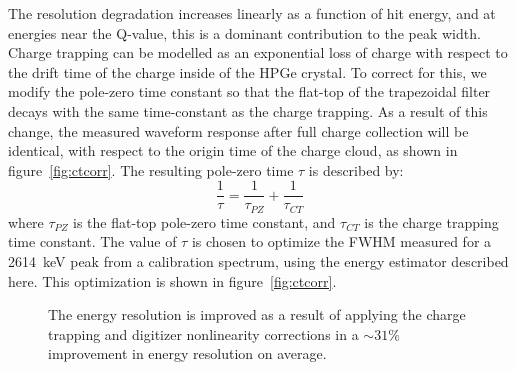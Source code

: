 \documentclass[/main.tex]{subfiles}
\begin{document}
The resolution degradation increases linearly as a function of hit energy, and at energies near the Q-value, this is a dominant contribution to the peak width.
Charge trapping can be modelled as an exponential loss of charge with respect to the drift time of the charge inside of the HPGe crystal.
To correct for this, we modify the pole-zero time constant so that the flat-top of the trapezoidal filter decays with the same time-constant as the charge trapping.
As a result of this change, the measured waveform response after full charge collection will be identical, with respect to the origin time of the charge cloud, as shown in figure~\ref{fig:ctcorr}.
The resulting pole-zero time $\tau$ is described by:
\begin{equation}
  \frac{1}{\tau} = \frac{1}{\tau_{PZ}} + \frac{1}{\tau_{CT}}
\end{equation}
where $\tau_{PZ}$ is the flat-top pole-zero time constant, and $\tau_{CT}$ is the charge trapping time constant.
The value of $\tau$ is chosen to optimize the FWHM measured for a 2614~keV peak from a  calibration spectrum, using the energy estimator described here.
This optimization is shown in figure~\ref{fig:ctcorr}.
\\
\begin{figure}
  \centering
  \caption[Improvement in energy resolution from charge trapping correction]{\label{fig:trapenf}
    The energy resolution is improved as a result of applying the charge trapping and digitizer nonlinearity corrections in a $\sim31\%$ improvement in energy resolution on average.
  }
\end{figure}
\end{document}
